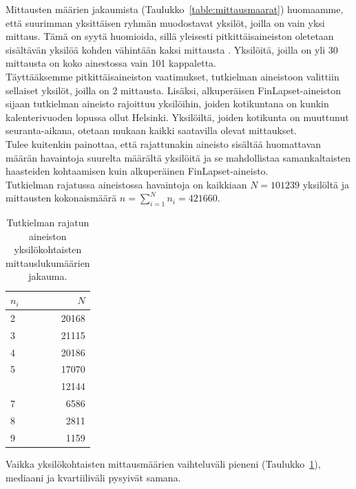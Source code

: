 \documentclass[finnish]{docopts}
\begin{document}
Mittausten määrien jakaumista (Taulukko~\ref{table:mittausmaarat}) huomaamme, että suurimman yksittäisen ryhmän muodostavat yksilöt, joilla on vain yksi mittaus. Tämä on syytä huomioida, sillä yleisesti pitkittäisaineiston oletetaan sisältävän yksilöä kohden vähintään kaksi mittausta \citep{west14}. Yksilöitä, joilla on yli 30 mittausta on koko ainestossa vain 101 kappaletta.\\

Täyttääksemme pitkittäisaineiston vaatimukset, tutkielman aineistoon valittiin sellaiset yksilöt, joilla on 2 mittausta. Lisäksi, alkuperäisen FinLapset-aineiston sijaan tutkielman aineisto rajoittuu yksilöihin, joiden kotikuntana on kunkin kalenterivuoden lopussa ollut Helsinki. Yksilöiltä, joiden kotikunta on muuttunut seuranta-aikana, otetaan mukaan kaikki saatavilla olevat mittaukset.\\

Tulee kuitenkin painottaa, että rajattunakin aineisto sisältää huomattavan määrän havaintoja suurelta määrältä yksilöitä ja se mahdollistaa samankaltaisten haasteiden kohtaamisen kuin alkuperäinen FinLapset-aineisto.\\

Tutkielman rajatussa aineistossa havaintoja on kaikkiaan $N = 101239$ yksilöltä ja mittausten kokonaismäärä $n = \sum\limits_{i = 1}^{N} n_{i} = 421660$. \\

\begin{table}[ht]
\centering
\begin{tabular}{lr}
\toprule
$n_i$ & $N$\\
\midrule
2 & 20168\\
3 & 21115\\
4 & 20186\\
5 & 17070\\
\addlinespace
6 & 12144\\
7 & 6586\\
8 & 2811\\
9 & 1159\\
\bottomrule
\end{tabular}
\caption{Tutkielman rajatun aineiston yksilökohtaisten mittauslukumäärien jakauma.}
\label{table:mittausmaaratrajattu}
\end{table}

Vaikka yksilökohtaisten mittausmäärien vaihteluväli pieneni (Taulukko~\ref{table:mittausmaaratrajattu}), mediaani ja kvartiiliväli pysyivät samana. \\
\end{document}
